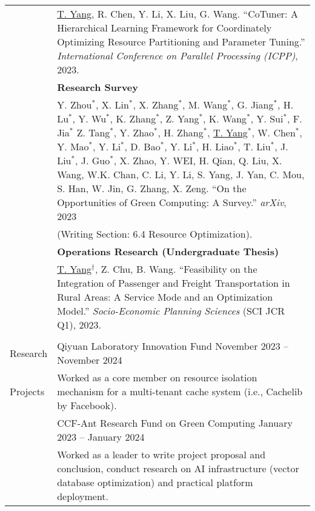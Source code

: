 \documentclass[letterpaper, 10pt]{article}
\begin{document}
\begin{longtable}{p{}p{}}
& \underline{T. Yang}, R. Chen, Y. Li, X. Liu, G. Wang. \enquote{CoTuner: A Hierarchical Learning Framework for Coordinately Optimizing Resource Partitioning and Parameter Tuning.} \textit{International Conference on Parallel Processing (ICPP)}, 2023.
\vspace{0.01\textwidth} \\

& \textbf{Research Survey} 
\vspace{0.01\textwidth} \\

& Y. Zhou$^*$, X. Lin$^*$, X. Zhang$^*$, M. Wang$^*$, G. Jiang$^*$, H. Lu$^*$, Y. Wu$^*$, K. Zhang$^*$, Z. Yang$^*$, K. Wang$^*$, Y. Sui$^*$, F. Jia$^*$ Z. Tang$^*$, Y. Zhao$^*$, H. Zhang$^*$, \underline{T. Yang}$^*$, W. Chen$^*$, Y. Mao$^*$, Y. Li$^*$, D. Bao$^*$, Y. Li$^*$, H. Liao$^*$, T. Liu$^*$, J. Liu$^*$, J. Guo$^*$, X. Zhao, Y. WEI, H. Qian, Q. Liu, X. Wang, W.K. Chan, C. Li, Y. Li, S. Yang, J. Yan, C. Mou, S. Han, W. Jin, G. Zhang, X. Zeng. \enquote{On the Opportunities of Green Computing: A Survey.} \textit{arXiv}, 2023 \\
& (Writing Section: 6.4 Resource Optimization). 
\vspace{0.01\textwidth} \\

& \textbf{Operations Research (Undergraduate Thesis)}
\vspace{0.01\textwidth} \\

& \underline{T. Yang}$^\dagger$, Z. Chu, B. Wang. \enquote{Feasibility on the Integration of Passenger and Freight Transportation in Rural Areas: A Service Mode and an Optimization Model.} \textit{Socio-Economic Planning Sciences} (SCI JCR Q1), 2023. \\
& \\


\nohyphens{\textcolor{OliveGreen}{Research}}
& {Qiyuan Laboratory Innovation Fund} \hfill  November 2023 -- November 2024 \\
\nohyphens{\textcolor{OliveGreen}{Projects}}
& Worked as a core member on resource isolation mechanism for a multi-tenant cache system (i.e., Cachelib by Facebook).
\vspace{0.01\textwidth} \\

& {CCF-Ant Research Fund on Green Computing} \hfill January 2023 -- January 2024 \\
& Worked as a leader to write project proposal and conclusion, conduct research on AI infrastructure (vector database optimization) and practical platform deployment.
\vspace{0.01\textwidth} \\


\end{longtable}
\end{document}
